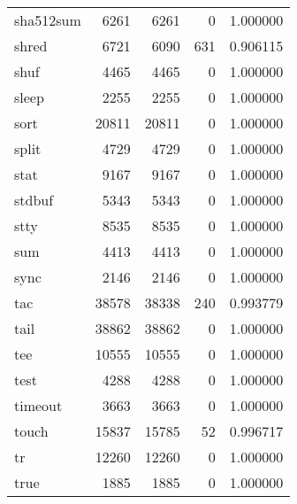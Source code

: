 \begin{longtable}{lrrrr}
sha512sum &                     6261 &         6261 &             0 &                 1.000000 \\
shred     &                     6721 &         6090 &           631 &                 0.906115 \\
shuf      &                     4465 &         4465 &             0 &                 1.000000 \\
sleep     &                     2255 &         2255 &             0 &                 1.000000 \\
sort      &                    20811 &        20811 &             0 &                 1.000000 \\
split     &                     4729 &         4729 &             0 &                 1.000000 \\
stat      &                     9167 &         9167 &             0 &                 1.000000 \\
stdbuf    &                     5343 &         5343 &             0 &                 1.000000 \\
stty      &                     8535 &         8535 &             0 &                 1.000000 \\
sum       &                     4413 &         4413 &             0 &                 1.000000 \\
sync      &                     2146 &         2146 &             0 &                 1.000000 \\
tac       &                    38578 &        38338 &           240 &                 0.993779 \\
tail      &                    38862 &        38862 &             0 &                 1.000000 \\
tee       &                    10555 &        10555 &             0 &                 1.000000 \\
test      &                     4288 &         4288 &             0 &                 1.000000 \\
timeout   &                     3663 &         3663 &             0 &                 1.000000 \\
touch     &                    15837 &        15785 &            52 &                 0.996717 \\
tr        &                    12260 &        12260 &             0 &                 1.000000 \\
true      &                     1885 &         1885 &             0 &                 1.000000 \\

\end{longtable}
